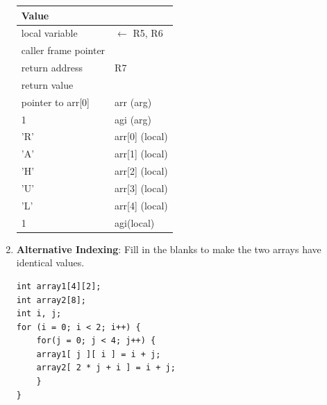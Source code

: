 \documentclass{article}
\begin{document}
\begin{enumerate}[label=(\alph*)]
\begin{center}
\begin{tabular}{|p{3cm} p{3cm} |} 
\hline
 Value &   \\ [0.5ex]
 \hline\hline
\hline
local variable  & $\xleftarrow{}$ R5, R6 \\
\hline 
caller frame pointer & \\
\hline 
return address &     R7\\
\hline 
return value & \\
\hline
 pointer to arr[0] & arr (arg) \\
\hline
 1    & agi (arg) \\
 \hline
 'R' & arr[0] (local)\\
 \hline
 'A' & arr[1] (local) \\
 \hline
 'H' & arr[2] (local) \\
 \hline
 'U' & arr[3] (local)\\ [1ex]
 \hline
 'L' & arr[4] (local) \\ [1ex]
  \hline
 1 & agi(local) \\[1ex]
  \hline
 
\end{tabular}
\end{center}
\newpage

\item \textbf{Alternative Indexing}: Fill in the blanks to make the two arrays have identical values.

\begin{lstlisting}[style=CStyle] 
int array1[4][2];
int array2[8];
int i, j;
for (i = 0; i < 2; i++) {
    for(j = 0; j < 4; j++) {
    array1[ j ][ i ] = i + j;
    array2[ 2 * j + i ] = i + j;
    }
}
\end{lstlisting}
\end{enumerate}
\newpage
\end{document}
